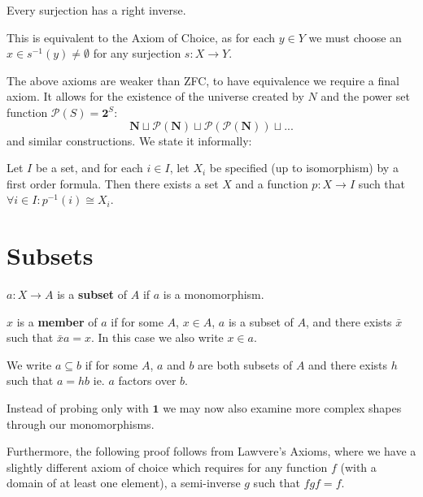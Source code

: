 \begin{axiom}[Choice]
Every surjection has a right inverse.
\end{axiom}

\begin{remark}
This is equivalent to the Axiom of Choice, as for each $y \in Y$ we must choose an $x \in s^{-1}(y) \neq \emptyset$ for any surjection $s: X \longrightarrow Y$.
\end{remark}

\begin{remark}
The above axioms are weaker than ZFC, to have equivalence we require a final axiom. It allows for the existence of the universe created by $N$ and the power set function $\mathcal{P}(S) = \mathbf{2}^S$:
\begin{equation*}
\mathbf{N} \sqcup \mathcal{P}(\mathbf{N}) \sqcup \mathcal{P}(\mathcal{P}(\mathbf{N})) \sqcup ...
\end{equation*}
 and similar constructions. We state it informally:
\end{remark}

\begin{axiom}[Replacement]
Let $I$ be a set, and for each $i \in I$, let $X_i$ be specified (up to isomorphism) by a first order formula. Then there exists a set $X$ and a function $p: X \longrightarrow I$ such that $\forall i \in I: p^{-1}(i) \cong X_i$. 
\end{axiom}

\section{Subsets}

\begin{definition}
$a:X \longrightarrow A$ is a \textbf{subset} of $A$ if $a$ is a monomorphism.

$x$ is a \textbf{member} of $a$ if for some $A$, $x \in A$, $a$ is a subset of $A$, and there exists $\bar{x}$ such that $\bar{x}a = x$. In this case we also write $x \in a$.

We write $a \subseteq b$ if for some $A$, $a$ and $b$ are both subsets of $A$ and there exists $h$ such that $a = hb$ ie. $a$ factors over $b$.
\end{definition}

\begin{remark}
Instead of probing only with $\mathbf{1}$ we may now also examine more complex shapes through our monomorphisms.

Furthermore, the following proof follows from Lawvere's Axioms, where we have a slightly different axiom of choice which requires for any function $f$ (with a domain of at least one element), a semi-inverse $g$ such that $fgf = f$.
\end{remark}

